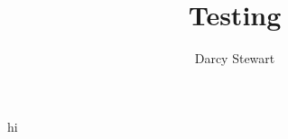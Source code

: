 \documentclass{article}
\title{Testing}
\author{Darcy Stewart}
\begin{document}
\maketitle
hi
\end{document}
